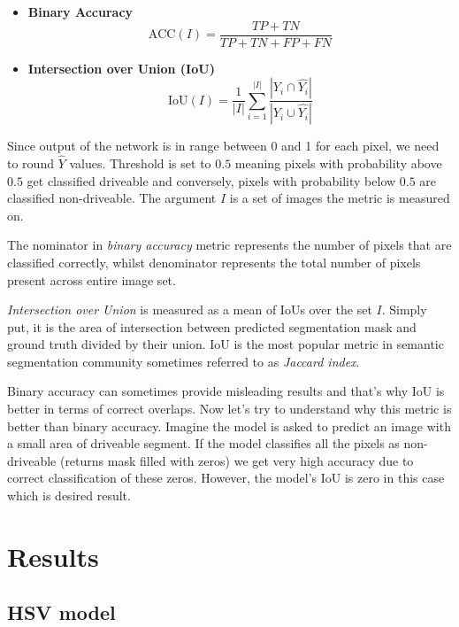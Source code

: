 \begin{itemize}
    \item \textbf{Binary Accuracy}
        $$\textrm{ACC}(I) = \frac{TP + TN}{TP + TN + FP + FN}$$
    \item \textbf{Intersection over Union (IoU)}
        $$\textrm{IoU}(I) = \frac{1}{|I|}\sum\limits_{i=1}^{|I|}
        \frac{|Y_i\cap \hat{Y_i}|}{|Y_i\cup \hat{Y_i}|}$$
\end{itemize}

Since output of the network is in range between 0 and 1 for each pixel,
we need to round $\hat{Y}$ 
values. Threshold is set to $0.5$ meaning pixels with probability above $0.5$ get
classified driveable and conversely, pixels with probability below $0.5$ are classified
non-driveable. The argument $I$ is a set of images the metric is measured on.

The nominator in \textit{binary accuracy} metric represents the number of pixels
that are classified correctly, whilst denominator represents the total number of pixels
present across entire image set.

\textit{Intersection over Union} is measured as a mean of IoUs over the set $I$.
Simply put, it is the area of intersection between predicted segmentation mask and
ground truth divided by their union. IoU is the most popular metric in semantic
segmentation community sometimes referred to as \textit{Jaccard index}. 

Binary accuracy can sometimes provide misleading results and that's why
IoU is better in terms of correct overlaps. Now let's try to understand why this metric 
is better than binary accuracy. Imagine the model is asked to predict an image with
a small area of driveable segment. If the model classifies all the pixels as non-driveable
(returns mask filled with zeros) we get very high accuracy due to correct classification of
these zeros. However, the model's IoU is zero in this case which is desired result.

\section{Results}
\label{sec:first_results}

\subsection{HSV model}
\label{sec:first_results:hsv}

